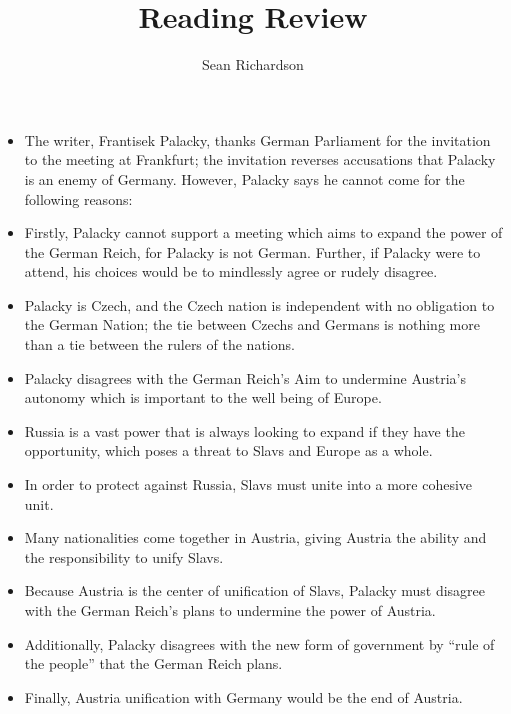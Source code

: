 \documentclass[12pt]{article}
\begin{document}
\title{Reading Review}
\author{Sean Richardson}
\maketitle
\begin{itemize}
    \item The writer, Frantisek Palacky, thanks German Parliament for the invitation to the meeting at Frankfurt; the invitation reverses accusations that Palacky is an enemy of Germany. However, Palacky says he cannot come for the following reasons:
    \item Firstly, Palacky cannot support a meeting which aims to expand the power of the German Reich, for Palacky is not German. Further, if Palacky were to attend, his choices would be to mindlessly agree or rudely disagree.
    \item Palacky is Czech, and the Czech nation is independent with no obligation to the German Nation; the tie between Czechs and Germans is nothing more than a tie between the rulers of the nations.
    \item Palacky disagrees with the German Reich’s Aim to undermine Austria’s autonomy which is important to the well being of Europe.
    \item Russia is a vast power that is always looking to expand if they have the opportunity, which poses a threat to Slavs and Europe as a whole.
    \item In order to protect against Russia, Slavs must unite into a more cohesive unit.
    \item Many nationalities come together in Austria, giving Austria the ability and the responsibility to unify Slavs.
    \item Because Austria is the center of unification of Slavs, Palacky must disagree with the German Reich’s plans to undermine the power of Austria.
    \item Additionally, Palacky disagrees with the new form of government by “rule of the people” that the German Reich plans.
    \item Finally, Austria unification with Germany would be the end of Austria.
\end{itemize}
\end{document}
